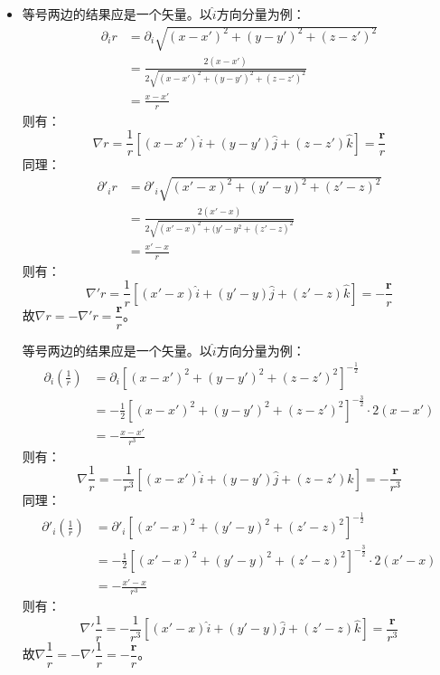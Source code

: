 \documentclass[a4paper,fontset=none]{ctexart}
\begin{document}
\begin{itemize}
        \item[3.(1)]
        \textparagraph 等号两边的结果应是一个矢量。以$\hat{i}$方向分量为例：
        \begin{align*}
            \partial_i r
            &= \partial_i \sqrt{(x-x')^2 + (y-y')^2 + (z-z')^2} \\
            &= \frac{2(x-x')}{2\sqrt{(x-x')^2 + (y-y')^2 + (z-z')^2}} \\
            &= \frac{x-x'}{r}
        \end{align*}
        则有：
        \[
            \nabla r = \frac{1}{r}\left[(x-x')\hat{i} + (y-y')\hat{j} + (z-z')\hat{k}\right] = \frac{\bm{r}}{r}
        \]
        同理：
        \begin{align*}
            \partial'_i r
            &= \partial'_i \sqrt{(x'-x)^2 + (y'-y)^2 + (z'-z)^2} \\
            &= \frac{2(x'-x)}{2\sqrt{(x'-x)^2 + (y'-y^2 + (z'-z)^2}} \\
            &= \frac{x'-x}{r}
        \end{align*}
        则有：
        \[
            \nabla' r = \dfrac{1}{r}\left[(x'-x)\hat{i} + (y'-y)\hat{j} + (z'-z)\hat{k}\right] = -\frac{\bm{r}}{r}
        \]
        故$\nabla r = -\nabla' r = \dfrac{\bm{r}}{r}$。

        \textparagraph 等号两边的结果应是一个矢量。以$\hat{i}$方向分量为例：
        \begin{align*}
            \partial_i\left(\frac{1}{r}\right)
            &= \partial_i \left[(x-x')^2 + (y-y')^2 + (z-z')^2\right]^{-\frac{1}{2}} \\
            &= -\frac{1}{2}\left[(x-x')^2 + (y-y')^2 + (z-z')^2\right]^{-\frac{3}{2}} \cdot 2(x-x') \\
            &= -\frac{x-x'}{r^3}
        \end{align*}
        则有：
        \[
            \nabla\frac{1}{r} = -\frac{1}{r^3}\left[(x-x')\hat{i} + (y-y')\hat{j} + (z-z')\hat{k}\right] = -\frac{\bm{r}}{r^3}
        \]
        同理：
        \begin{align*}
            \partial'_i\left(\frac{1}{r}\right)
            &= \partial'_i \left[(x'-x)^2 + (y'-y)^2 + (z'-z)^2\right]^{-\frac{1}{2}} \\
            &= -\frac{1}{2}\left[(x'-x)^2 + (y'-y)^2 + (z'-z)^2\right]^{-\frac{3}{2}} \cdot 2(x'-x) \\
            &= -\frac{x'-x}{r^3}
        \end{align*}
        则有：
        \[
            \nabla'\frac{1}{r} = -\frac{1}{r^3}\left[(x'-x)\hat{i} + (y'-y)\hat{j} + (z'-z)\hat{k}\right] = \frac{\bm{r}}{r^3}
        \]
        故$\nabla\dfrac{1}{r} = -\nabla'\dfrac{1}{r} = -\dfrac{\bm{r}}{r}$。


\end{itemize}
\end{document}
